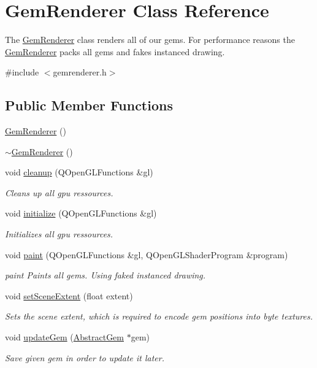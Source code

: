 \hypertarget{class_gem_renderer}{}\section{Gem\+Renderer Class Reference}
\label{class_gem_renderer}


The \hyperlink{class_gem_renderer}{Gem\+Renderer} class renders all of our gems.  For performance reasons the \hyperlink{class_gem_renderer}{Gem\+Renderer} packs all gems and fakes instanced drawing.  




{\ttfamily \#include $<$gemrenderer.\+h$>$}

\subsection*{Public Member Functions}
\begin{DoxyCompactItemize}
\item 
\hyperlink{class_gem_renderer_ab7d20a029bd5b43a1a6f9ed660cfebd8}{Gem\+Renderer} ()
\item 
\hyperlink{class_gem_renderer_af66cf5ad414c21487c8513a8e5bf972a}{$\sim$\+Gem\+Renderer} ()
\item 
void \hyperlink{class_gem_renderer_a9da8103dc08a4203727b6967337fa65b}{cleanup} (Q\+Open\+G\+L\+Functions \&gl)
\begin{DoxyCompactList}\small\item\em Cleans up all gpu ressources. \end{DoxyCompactList}\item 
void \hyperlink{class_gem_renderer_a2d4dc2d6f9b1aae7dc1e8b8d09b153de}{initialize} (Q\+Open\+G\+L\+Functions \&gl)
\begin{DoxyCompactList}\small\item\em Initializes all gpu ressources. \end{DoxyCompactList}\item 
void \hyperlink{class_gem_renderer_a0a1765f07c953c05b1d7865f356b7ba2}{paint} (Q\+Open\+G\+L\+Functions \&gl, Q\+Open\+G\+L\+Shader\+Program \&program)
\begin{DoxyCompactList}\small\item\em paint Paints all gems. Using faked instanced drawing. \end{DoxyCompactList}\item 
void \hyperlink{class_gem_renderer_afdc5555e3e82c4a021deac461fffe435}{set\+Scene\+Extent} (float extent)
\begin{DoxyCompactList}\small\item\em Sets the scene extent, which is required to encode gem positions into byte textures. \end{DoxyCompactList}\item 
void \hyperlink{class_gem_renderer_a4be8d2a7b1443262392adc828f3910c8}{update\+Gem} (\hyperlink{class_abstract_gem}{Abstract\+Gem} $\ast$gem)
\begin{DoxyCompactList}\small\item\em Save given gem in order to update it later. \end{DoxyCompactList}\end{DoxyCompactItemize}
